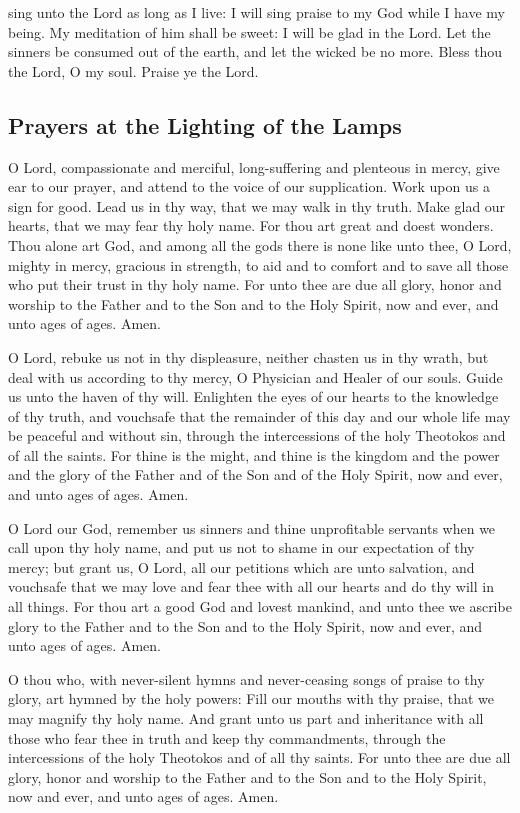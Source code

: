 sing unto the Lord as long as I live: I will sing praise to my God while I have my being. My meditation of him shall be sweet: I will be glad in the Lord. Let the sinners be consumed out of the earth, and let the wicked be no more. Bless thou the Lord, O my soul. Praise ye the Lord.

\subsection{Prayers at the Lighting of the Lamps}
 O Lord, compassionate and merciful, long-suffering and plenteous in mercy, give ear to our prayer, and attend to the voice of our supplication. Work upon us a sign for good. Lead us in thy way, that we may walk in thy truth. Make glad our hearts, that we may fear thy holy name. For thou art great and doest wonders. Thou alone art God, and among all the gods there is none like unto thee, O Lord, mighty in mercy, gracious in strength, to aid and to comfort and to save all those who put their trust in thy holy name. For unto thee are due all glory, honor and worship to the Father and to the Son and to the Holy Spirit, now and ever, and unto ages of ages. Amen.

 O Lord, rebuke us not in thy displeasure, neither chasten us in thy wrath, but deal with us according to thy mercy, O Physician and Healer of our souls. Guide us unto the haven of thy will. Enlighten the eyes of our hearts to the knowledge of thy truth, and vouchsafe that the remainder of this day and our whole life may be peaceful and without sin, through the intercessions of the holy Theotokos and of all the saints. For thine is the might, and thine is the kingdom and the power and the glory of the Father and of the Son and of the Holy Spirit, now and ever, and unto ages of ages. Amen.

 O Lord our God, remember us sinners and thine unprofitable servants when we call upon thy holy name, and put us not to shame in our expectation of thy mercy; but grant us, O Lord, all our petitions which are unto salvation, and vouchsafe that we may love and fear thee with all our hearts and do thy will in all things. For thou art a good God and lovest mankind, and unto thee we ascribe glory to the Father and to the Son and to the Holy Spirit, now and ever, and unto ages of ages. Amen.

 O thou who, with never-silent hymns and never-ceasing songs of praise to thy glory, art hymned by the holy powers: Fill our mouths with thy praise, that we may magnify thy holy name. And grant unto us part and inheritance with all those who fear thee in truth and keep thy commandments, through the intercessions of the holy Theotokos and of all thy saints. For unto thee are due all glory, honor and worship to the Father and to the Son and to the Holy Spirit, now and ever, and unto ages of ages. Amen.

